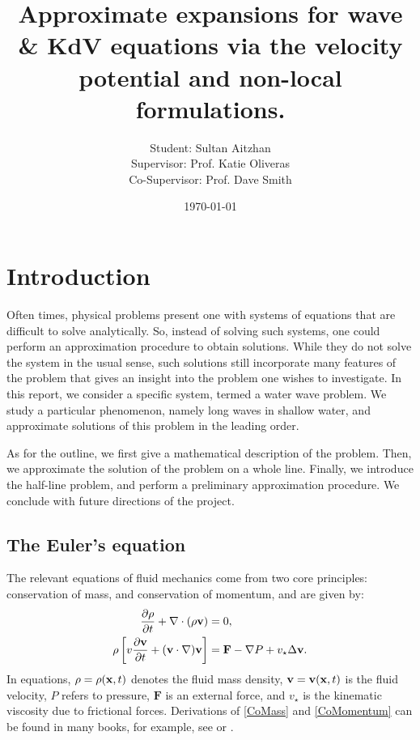 \documentclass[10pt,reqno,oneside,a4paper]{article}
\author{Student: Sultan Aitzhan \\Supervisor: Prof. Katie Oliveras \\ Co-Supervisor: Prof. Dave Smith}
\title{Approximate expansions for wave \& KdV equations via the velocity potential and non-local formulations.}
\date{\today}
\begin{document}
\maketitle
\thispagestyle{fancy}
\tableofcontents

\section{Introduction}
Often times, physical problems present one with systems of equations that are difficult to solve analytically. So, instead of solving such systems, one could perform an approximation procedure to obtain solutions. While they do not solve the system in the usual sense, such solutions still incorporate many features of the problem that gives an insight into the problem one wishes to investigate. In this report, we consider a specific system, termed a water wave problem. We study a particular phenomenon, namely long waves in shallow water, and approximate solutions of this problem in the leading order. 

As for the outline, we first give a mathematical description of the problem. Then, we approximate the solution of the problem on a whole line. Finally, we introduce the half-line problem, and perform a preliminary approximation procedure. We conclude with future directions of the project.

\subsection{The Euler's equation}
The relevant equations of fluid mechanics come from two core principles: conservation of mass, and conservation of momentum, and are given by:
\begin{align}
\frac{\partial \rho}{\partial t} + \nabla \cdot (\rho {\bf v}) &= 0, \label{CoMass} \\
\rho\left[ v\frac{\partial {\bf v}}{\partial t} + ({\bf v} \cdot \nabla) {\bf v}\right] &= \textbf{F} - \nabla P + v_{\star} \Delta {\bf v}. \label{CoMomentum}
\end{align}
In equations, $\rho = \rho({\bf x}, t)$ denotes the fluid mass density, ${\bf v} = {\bf v}({\bf x},t)$ is the fluid velocity, $P$ refers to pressure, $\textbf{F}$ is an external force, and $v_{\star}$ is the kinematic viscosity due to frictional forces. Derivations of \eqref{CoMass} and \eqref{CoMomentum} can be found in many books, for example, see \cite[Chapter 3]{batchelor} or \cite[Chapter 1]{marsden}.
\end{document}

